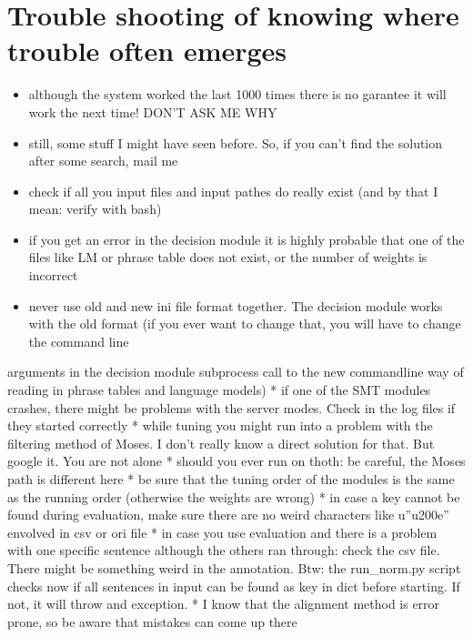 \documentclass[letterpaper,10pt,english]{sphinxmanual}
\begin{document}
\section{Trouble shooting of knowing where trouble often emerges}
\label{\detokenize{README:trouble-shooting-of-knowing-where-trouble-often-emerges}}\begin{itemize}
\item {} 
although the system worked the last 1000 times there is no garantee it will work the next time! DON’T ASK ME WHY

\item {} 
still, some stuff I might have seen before. So, if you can’t find the solution after some search, mail me

\item {} 
check if all you input files and input pathes do really exist (and by that I mean: verify with bash)

\item {} 
if you get an error in the decision module it is highly probable that one of the files like LM or phrase table does not exist, or the number of weights is incorrect

\item {} 
never use old and new ini file format together. The decision module works with the old format (if you ever want to change that, you will have to change the command line

\end{itemize}

arguments in the decision module subprocess call to the new commandline way of reading in phrase tables and language models)
* if one of the SMT modules crashes, there might be problems with the server modes. Check in the log files if they started correctly
* while tuning you might run into a problem with the filtering method of Moses. I don’t really know a direct solution for that. But google it. You are not alone
* should you ever run on thoth: be careful, the Moses path is different here
* be sure that the tuning order of the modules is the same as the running order (otherwise the weights are wrong)
* in case a key cannot be found during evaluation, make sure there are no weird characters like u”u200e” envolved in csv or ori file
* in case you use evaluation and there is a problem with one specific sentence although the others ran through: check the csv file. There might be something weird in the
annotation. Btw: the run\_norm.py script checks now if all sentences in input can be found as key in dict before starting. If not, it will throw and exception.
* I know that the alignment method is error prone, so be aware that mistakes can come up there
\end{document}
